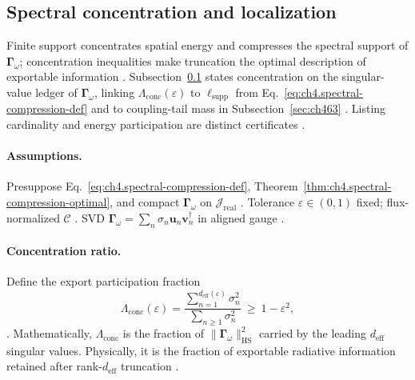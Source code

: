 ﻿\subsection{Spectral concentration and localization}
\label{sec:ch483}

Finite support concentrates spatial energy and compresses the spectral support of \(\boldsymbol{\Gamma}_\omega\); concentration inequalities make
truncation the optimal description of exportable information \cite{stratton1941,jackson1999,hansen1988}. Subsection~\ref{sec:ch483} states concentration
on the singular-value ledger of \(\boldsymbol{\Gamma}_\omega\), linking \(\Lambda_{\mathrm{conc}}(\varepsilon)\) to \(\ell_{\mathrm{supp}}\) from
Eq.~\eqref{eq:ch4.spectral-compression-def} and to coupling-tail mass in Subsection~\ref{sec:ch463} \cite{harrington2001,devaney2004}. Listing
cardinality and energy participation are distinct certificates \cite{stratton1941,hansen1988}.

\paragraph{Assumptions.}
Presuppose Eq.~\eqref{eq:ch4.spectral-compression-def}, Theorem~\ref{thm:ch4.spectral-compression-optimal}, and compact \(\boldsymbol{\Gamma}_\omega\)
on \(\mathcal{J}_{\mathrm{real}}\) \cite{stratton1941,harrington2001,hansen1988}. Tolerance \(\varepsilon\in(0,1)\) fixed; flux-normalized \(\mathcal{C}\)
\cite{devaney2004}. SVD \(\boldsymbol{\Gamma}_\omega=\sum_{n}\sigma_{n}\mathbf{u}_{n}\mathbf{v}_{n}^{\dagger}\) in aligned gauge \cite{harrington2001}.

\paragraph{Concentration ratio.}
Define the export participation fraction
\begin{equation}
\label{eq:ch4.spectral-concentration-ratio}
\Lambda_{\mathrm{conc}}(\varepsilon)=\frac{\sum_{n=1}^{d_{\mathrm{eff}}(\varepsilon)}\sigma_{n}^{2}}{\sum_{n\ge1}\sigma_{n}^{2}}\ \ge\ 1-\varepsilon^{2},
\end{equation}
\cite{harrington2001,hansen1988,stratton1941}. Mathematically, \(\Lambda_{\mathrm{conc}}\) is the fraction of \(\|\boldsymbol{\Gamma}_\omega\|_{\mathrm{HS}}^{2}\)
carried by the leading \(d_{\mathrm{eff}}\) singular values. Physically, it is the fraction of exportable radiative information retained after rank-\(d_{\mathrm{eff}}\)
truncation \cite{devaney2004,hansen1988}.

